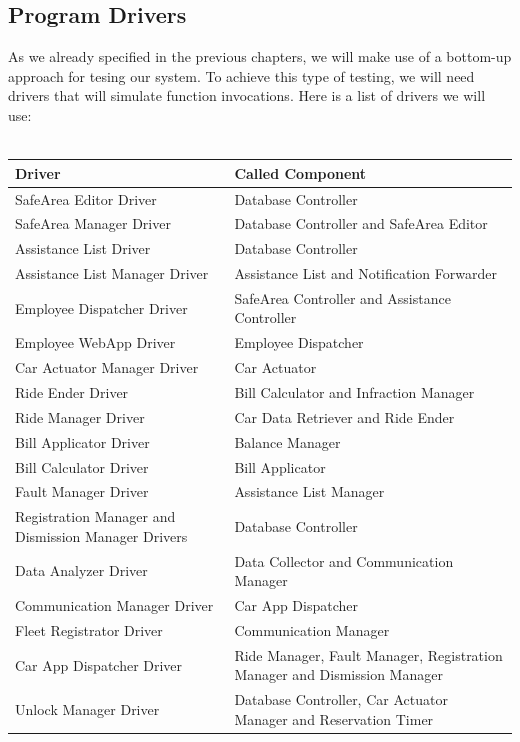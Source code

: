 \documentclass{article}
\begin{document}
\subsection{Program Drivers}
As we already specified in the previous chapters, we will make use of a bottom-up approach for tesing our system. To achieve this type of testing, we will need drivers that will simulate function invocations.
Here is a list of drivers we will use: \\\\
\begin{tabular}{ |p{5cm}|p{7cm}| }
  \hline
  \textbf{Driver} & \textbf{Called Component} \\
  \hline
  SafeArea Editor Driver & Database Controller\\
  \hline
  SafeArea Manager Driver & Database Controller and SafeArea Editor \\
  \hline
  Assistance List Driver & Database Controller \\
  \hline
  Assistance List Manager Driver & Assistance List and Notification Forwarder\\
  \hline
  Employee Dispatcher Driver & SafeArea Controller and Assistance Controller\\
  \hline
  Employee WebApp Driver & Employee Dispatcher\\
  \hline
 Car Actuator Manager Driver  & Car Actuator\\
  \hline
  Ride Ender Driver & Bill Calculator and Infraction Manager\\
  \hline
  Ride Manager Driver & Car Data Retriever and Ride Ender\\
  \hline
  Bill Applicator Driver & Balance Manager\\
  \hline
  Bill Calculator Driver & Bill Applicator\\
  \hline
  Fault Manager Driver & Assistance List Manager\\
  \hline
  Registration Manager and Dismission Manager Drivers & Database Controller\\
  \hline
  Data Analyzer Driver & Data Collector and Communication Manager\\
  \hline
  Communication Manager Driver & Car App Dispatcher\\
  \hline
  Fleet Registrator Driver & Communication Manager\\
  \hline
  Car App Dispatcher Driver & Ride Manager, Fault Manager, Registration Manager and Dismission Manager\\
  \hline
  Unlock Manager Driver & Database Controller, Car Actuator Manager and Reservation Timer\\

\end{tabular}
\end{document}
